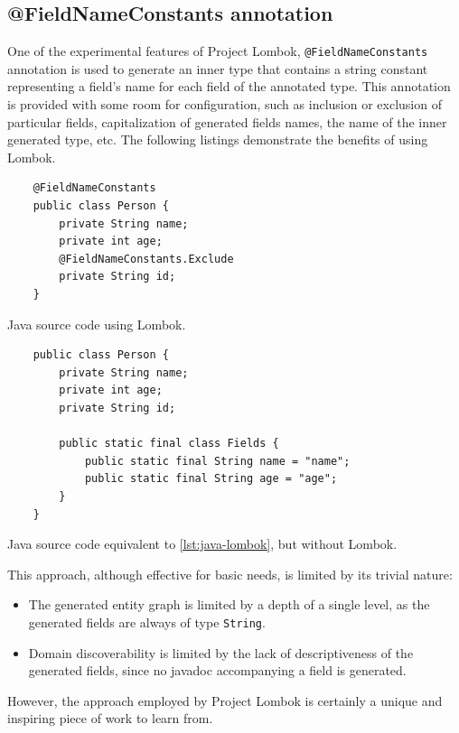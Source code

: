 \subsection{@FieldNameConstants annotation}
One of the experimental features of Project Lombok, \texttt{@FieldNameConstants} \cite{lombok-fnc} annotation is used to generate an inner type that contains a string constant representing a field’s name for each field of the annotated type.
This annotation is provided with some room for configuration, such as inclusion or exclusion of particular fields, capitalization of generated fields names, the name of the inner generated type, etc.
The following listings demonstrate the benefits of using Lombok.

\begin{listing}[H]
    \begin{verbatim}
    @FieldNameConstants
    public class Person {
        private String name;
        private int age;
        @FieldNameConstants.Exclude
        private String id;
    }
    \end{verbatim}
    \caption{Java source code using Lombok.}\label{lst:java-lombok}
\end{listing}

\begin{listing}[H]
    \begin{verbatim}
    public class Person {
        private String name;
        private int age;
        private String id;

        public static final class Fields {
            public static final String name = "name";
            public static final String age = "age";
        }
    }
    \end{verbatim}
    \caption{Java source code equivalent to \ref{lst:java-lombok}, but without Lombok.}
    \label{lst:java-no-lombok}
\end{listing}

This approach, although effective for basic needs, is limited by its trivial nature:
\begin{itemize}
    \item The generated entity graph is limited by a depth of a single level, as the generated fields are always of type \texttt{String}.
    \item Domain discoverability is limited by the lack of descriptiveness of the generated fields, since no javadoc accompanying a field is generated.
\end{itemize}

However, the approach employed by Project Lombok is certainly a unique and inspiring piece of work to learn from.

